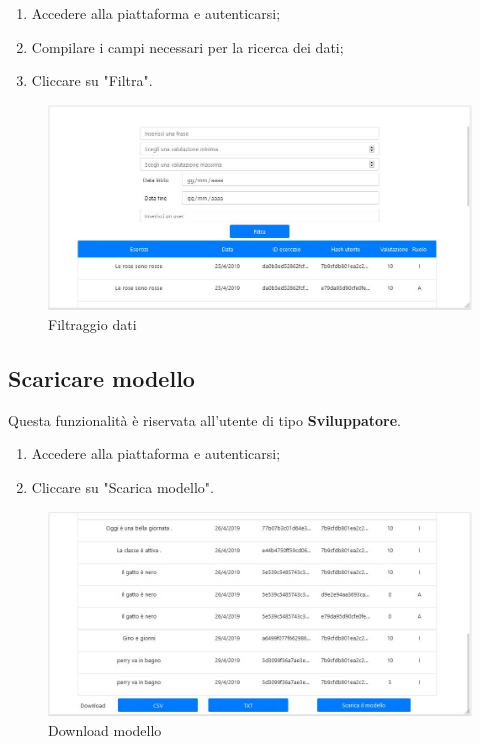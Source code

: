 \documentclass[11pt,a4paper]{article}
\begin{document}
{		\begin{enumerate}
			\item Accedere alla piattaforma e autenticarsi;
			\item Compilare i campi necessari per la ricerca dei dati;
			\item Cliccare su "Filtra".
		\end{enumerate}
	

		\begin{figure}[h]
		\centering
		\includegraphics[scale=0.65]{images/filtrodati.jpg}
		\caption{Filtraggio dati}
		\end{figure}
		
	
	\newpage
	
	\subsection{Scaricare modello}
		Questa funzionalità è riservata all'utente di tipo \textbf{Sviluppatore}.\\
		
		\begin{enumerate}
			\item Accedere alla piattaforma e autenticarsi;
			\item Cliccare su "Scarica modello".
		\end{enumerate}
	
	\begin{center}
	\begin{figure}[h]
		\includegraphics[scale=0.65]{images/scaricamodello.jpg}
		\caption{Download modello}
	\end{figure}
\end{center}
				
}
\end{document}
